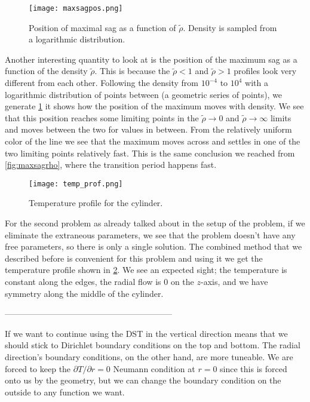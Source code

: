 \documentclass[10pt,a4paper,twocolumn]{article}
\begin{document}
\begin{figure}[!t]
    \centering
    \texttt{[image: maxsagpos.png]}
    \caption{Position of maximal sag as a function of $\tilde{\rho}$. Density is sampled from a logarithmic distribution.}
    \label{fig:maxsagpos}
\end{figure}

Another interesting quantity to look at is the position of the maximum sag as a function of the density $\tilde{\rho}$. This is because the $\tilde{\rho} < 1$ and $\tilde{\rho} > 1$ profiles look very different from each other. Following the density from $10^{-4}$ to $10^{4}$ with a logarithmic distribution of points between (a geometric series of points), we generate \cref{fig:maxsagpos} it shows how the position of the maximum moves with density. We see that this position reaches some limiting points in the $\tilde{\rho} \rightarrow 0$ and $\tilde{\rho} \rightarrow \infty$ limits and moves between the two for values in between. From the relatively uniform color of the line we see that the maximum moves across and settles in one of the two limiting points relatively fast. This is the same conclusion we reached from \cref{fig:maxsagrho}, where the transition period happens fast. 




\begin{figure}[!t]
    \centering
    \texttt{[image: temp\_prof.png]}
    \caption{Temperature profile for the cylinder.}
    \label{fig:temp_prof}
\end{figure}



For the second problem as already talked about in the setup of the problem, if we eliminate the extraneous parameters, we see that the problem doesn't have any free parameters, so there is only a single solution. The combined method that we described before is convenient for this problem and using it we get the temperature profile shown in \cref{fig:temp_prof}. We see an expected sight; the temperature is constant along the edges, the radial flow is $0$ on the $z$-axis, and we have symmetry along the middle of the cylinder.

------------------------------------------------------------

If we want to continue using the DST in the vertical direction means that we should stick to Dirichlet boundary conditions on the top and bottom. The radial direction's boundary conditions, on the other hand, are more tuneable. We are forced to keep the $\partial T/ 
\partial r = 0$ Neumann condition at $r=0$ since this is forced onto us by the geometry, but we can change the boundary condition on the outside to any function we want.
\end{document}
